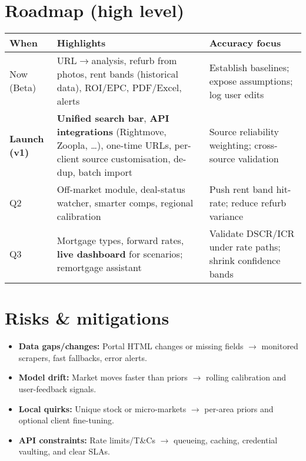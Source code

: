 \documentclass[11pt,a4paper]{article}
\begin{document}
\section*{Roadmap (high level)}
\begin{center}
\begin{tabularx}{\linewidth}{@{}p{2.2cm} X X@{}}
\toprule
\textbf{When} & \textbf{Highlights} & \textbf{Accuracy focus}\\
\midrule
Now (Beta) & URL$\rightarrow$analysis, refurb from photos, rent bands (historical data), ROI/EPC, PDF/Excel, alerts & Establish baselines; expose assumptions; log user edits\\
\textbf{Launch (v1)} & \textbf{Unified search bar}, \textbf{API integrations} (Rightmove, Zoopla, \dots), one-time URLs, per-client source customisation, de-dup, batch import & Source reliability weighting; cross-source validation\\
Q2 & Off-market module, deal-status watcher, smarter comps, regional calibration & Push rent band hit-rate; reduce refurb variance\\
Q3 & Mortgage types, forward rates, \textbf{live dashboard} for scenarios; remortgage assistant & Validate DSCR/ICR under rate paths; shrink confidence bands\\
\bottomrule
\end{tabularx}
\end{center}

\section*{Risks \& mitigations}
\begin{itemize}
  \item \textbf{Data gaps/changes:} Portal HTML changes or missing fields $\rightarrow$ monitored scrapers, fast fallbacks, error alerts.
  \item \textbf{Model drift:} Market moves faster than priors $\rightarrow$ rolling calibration and user-feedback signals.
  \item \textbf{Local quirks:} Unique stock or micro-markets $\rightarrow$ per-area priors and optional client fine-tuning.
  \item \textbf{API constraints:} Rate limits/T\&Cs $\rightarrow$ queueing, caching, credential vaulting, and clear SLAs.
\end{itemize}   
\end{document}
